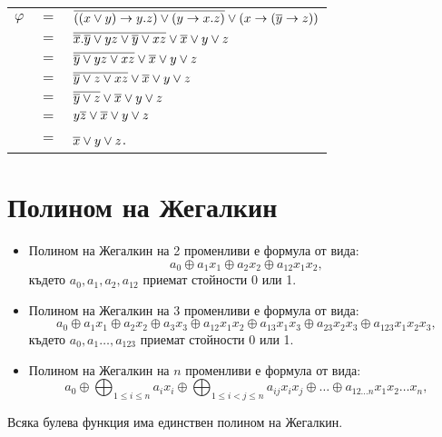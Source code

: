\begin{solution}
\begin{enumerate}[a)]
    \begin{tabular}{l c l}
      $\varphi $ & $ = $ & $\overline{((x\vee y) \rightarrow y.z)\vee (y\rightarrow x.z)} \vee (x\rightarrow (\overline{y}\rightarrow z)) $\\
      & $=$ & $\overline{\overline{x}.\overline{y}\vee yz \vee \overline{y}\vee xz} \vee \overline{x}\vee y \vee z$\\
      & $=$& $\overline{\overline{y}\vee yz \vee xz} \vee \overline{x}\vee y \vee z$ \\
      & $=$ & $\overline{\overline{y}\vee z \vee xz} \vee \overline{x}\vee y \vee z$\\
      & $=$ & $\overline{\overline{y}\vee z} \vee \overline{x}\vee y \vee z$ \\
      & $=$ & $y\overline{z} \vee \overline{x}\vee y \vee z$ \\
      & $=$ & $\overline{x}\vee y \vee z$.
    \end{tabular}
\end{enumerate}
\end{solution}




\section{Полином на Жегалкин}

\begin{itemize}
\item 
  Полином на Жегалкин на 2 променливи е формула от вида:
  \[a_0\oplus a_1x_1\oplus a_2x_2  \oplus a_{12}x_1x_2  ,\]
  където $a_0,a_1,a_2,a_{12}$ приемат стойности 0 или 1.
\item
  Полином на Жегалкин на 3 променливи е формула от вида:
  \[a_0\oplus a_1x_1\oplus a_2x_2 \oplus a_3x_3 \oplus a_{12}x_1x_2 \oplus a_{13}x_1x_3 \oplus a_{23} x_2x_3 \oplus a_{123}x_1x_2x_3,\]  
  където $a_0,a_1\dots,a_{123}$ приемат стойности 0 или 1.
\item
  Полином на Жегалкин на $n$ променливи е формула от вида:
  \[a_0 \oplus \bigoplus_{1\leq i\leq n}a_i x_i\oplus \bigoplus_{1\leq i<j \leq n}a_{ij} x_ix_j\oplus\dots  \oplus a_{12\dots n} x_1x_2\dots x_n,\]
\end{itemize}

\begin{thm}
  Всяка булева функция има единствен полином на Жегалкин.
\end{thm}


